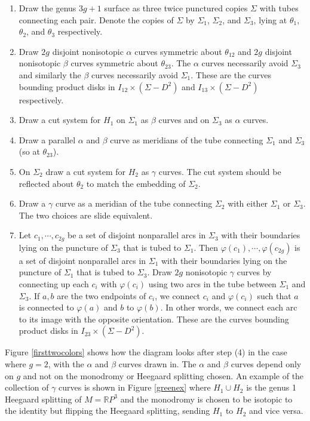 \documentclass[12pt]{amsart}
\newcommand{\R}{\mathbb{R}}
\theoremstyle{definition}
\theoremstyle{remark}
\begin{document}
\begin{enumerate}
\item Draw the genus $3g+1$ surface as three twice punctured copies $\Sigma$ with tubes connecting each pair.  Denote the copies of $\Sigma$ by $\Sigma_1$, $\Sigma_2$, and $\Sigma_3$, lying at $\theta_1$, $\theta_2$, and $\theta_3$ respectively.
\item Draw $2g$ disjoint nonisotopic $\alpha$ curves symmetric about $\theta_{12}$ and $2g$ disjoint nonisotopic $\beta$ curves symmetric about $\theta_{23}$.  The $\alpha$ curves necessarily avoid $\Sigma_3$ and similarly the $\beta$ curves necessarily avoid $\Sigma_1$.  These are the curves bounding product disks in $I_{12} \times (\Sigma - D^2)$ and $I_{13} \times (\Sigma - D^2)$ respectively.
\item Draw a cut system for $H_1$ on $\Sigma_1$ as $\beta$ curves and on $\Sigma_3$ as $\alpha$ curves.
\item Draw a parallel $\alpha$ and $\beta$ curve as meridians of the tube connecting  $\Sigma_1$ and $\Sigma_3$ (so at $\theta_{23}$). 
\item On $\Sigma_2$ draw a cut system for $H_2$ as $\gamma$ curves.  The cut system should be reflected about $\theta_2$ to match the embedding of $\Sigma_2$.
\item Draw a $\gamma$ curve as a meridian of the tube connecting $\Sigma_2$ with either $\Sigma_1$ or $\Sigma_3$.  The two choices are slide equivalent.
\item Let $c_1,\cdots,c_{2g}$ be a set of disjoint nonparallel arcs in $\Sigma_3$ with their boundaries lying on the puncture of $\Sigma_3$ that is tubed to $\Sigma_1$.  Then $\varphi(c_1),\cdots,\varphi(c_{2g})$ is a set of disjoint nonparallel arcs in $\Sigma_1$ with their boundaries lying on the puncture of $\Sigma_1$ that is tubed to $\Sigma_3$.  Draw $2g$ nonisotopic $\gamma$ curves by connecting up each $c_i$ with $\varphi(c_i)$ using two arcs in the tube between $\Sigma_1$ and $\Sigma_3$.  If $a,b$ are the two endpoints of $c_i$, we connect $c_i$ and $\varphi(c_i)$ such that $a$ is connected to $\varphi(a)$ and $b$ to $\varphi(b)$.  In other words, we connect each arc to its image with the opposite orientation.  These are the curves bounding product disks in $I_{23} \times (\Sigma - D^2)$.
\end{enumerate}

Figure \ref{firsttwocolors} shows how the diagram looks after step (4) in the case where $g=2$, with the $\alpha$ and $\beta$ curves drawn in.  The $\alpha$ and $\beta$ curves depend only on $g$ and not on the monodromy or Heegaard splitting chosen.  An example of the collection of $\gamma$ curves is shown in Figure \ref{greenex} where $H_1 \cup H_2$ is the genus 1 Heegaard splitting of $M = \R P^3$ and the monodromy is chosen to be isotopic to the identity but flipping the Heegaard splitting, sending $H_1$ to $H_2$ and vice versa.
\end{document}
